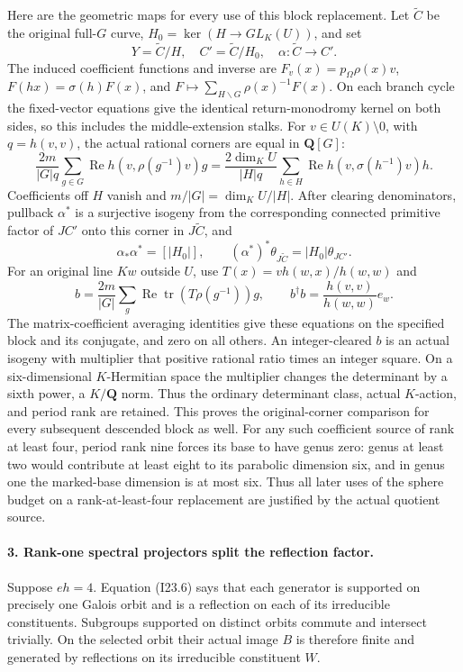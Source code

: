 Here are the geometric maps for every use of this block replacement.
Let \(\widetilde C\) be the original full-\(G\) curve,
\(H_0=\ker(H\to GL_K(U))\), and set
\[
 Y=\widetilde C/H,
 \quad C'=\widetilde C/H_0,
 \quad \alpha:\widetilde C\longrightarrow C'.             \tag{I23.9}
\]
The induced coefficient functions and inverse are
\(F_v(x)=p_\Omega\rho(x)v\),
\(F(hx)=\sigma(h)F(x)\), and
\(F\mapsto\sum_{H\backslash G}\rho(x)^{-1}F(x)\).
On each branch cycle the fixed-vector equations give the identical
return-monodromy kernel on both sides, so this includes the
middle-extension stalks. For \(v\in U(K)\setminus0\), with
\(q=h(v,v)\), the actual rational corners are equal in
\(\mathbf Q[G]\):
\[
 \frac{2m}{|G|q}\sum_{g\in G}\operatorname{Re}h(v,\rho(g^{-1})v)g
 =\frac{2\dim_KU}{|H|q}\sum_{h\in H}
                         \operatorname{Re}h(v,\sigma(h^{-1})v)h.
                                                               \tag{I23.10}
\]
Coefficients off \(H\) vanish and \(m/|G|=\dim_KU/|H|\).
After clearing denominators, pullback \(\alpha^*\) is a
surjective isogeny from the corresponding connected primitive
factor of \(JC'\) onto this corner in \(J\widetilde C\), and
\[
 \alpha_*\alpha^*=[|H_0|],\qquad
 (\alpha^*)^*\theta_{J\widetilde C}=|H_0|\theta_{JC'}.
                                                               \tag{I23.11}
\]
For an original line \(Kw\) outside \(U\), use
\(T(x)=v h(w,x)/h(w,w)\) and
\[
 b=\frac{2m}{|G|}\sum_g\operatorname{Re}\operatorname{tr}
                         (T\rho(g^{-1}))g,
 \qquad b^\dagger b=\frac{h(v,v)}{h(w,w)}e_w.                \tag{I23.12}
\]
The matrix-coefficient averaging identities give these equations
on the specified block and its conjugate, and zero on all others.
An integer-cleared \(b\) is an actual isogeny with multiplier
that positive rational ratio times an integer square. On a
six-dimensional \(K\)-Hermitian space the multiplier changes
the determinant by a sixth power, a \(K/\mathbf Q\) norm.
Thus the ordinary determinant class, actual \(K\)-action,
and period rank are retained. This proves the original-corner
comparison for every subsequent descended block as well.
For any such coefficient source of rank at least four, period rank
nine forces its base to have genus zero: genus at least two would
contribute at least eight to its parabolic dimension six, and in
genus one the marked-base dimension is at most six. Thus all later
uses of the sphere budget on a rank-at-least-four replacement are
justified by the actual quotient source.

\paragraph{3. Rank-one spectral projectors split the reflection factor.}
Suppose \(eh=4\). Equation (I23.6) says that each generator is
supported on precisely one Galois orbit and is a reflection on
each of its irreducible constituents. Subgroups supported on
distinct orbits commute and intersect trivially. On the selected
orbit their actual image \(B\) is therefore finite and generated
by reflections on its irreducible constituent \(W\).

